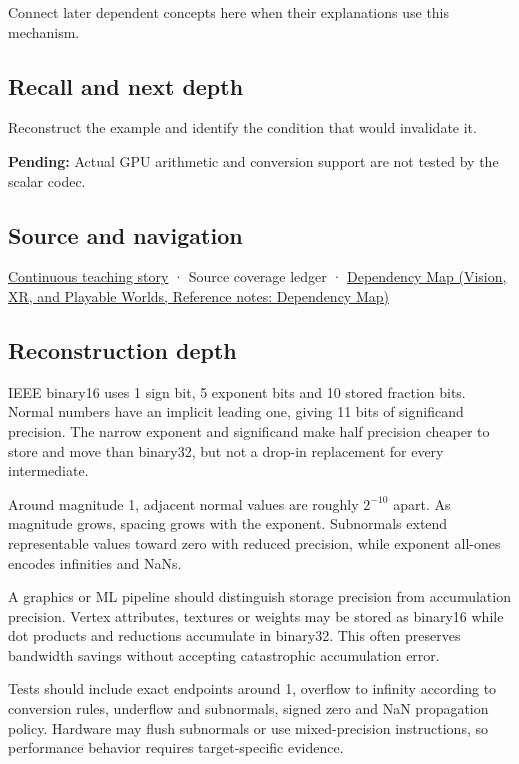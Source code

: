 Connect later dependent concepts here when their explanations use this mechanism.

\subsection{Recall and next depth}\label{appendix-34443cec7170-recall-and-next-depth}

\hypertarget{appendix-34443cec7170-recall-and-next-depth}{}

Reconstruct the example and identify the condition that would invalidate it.

\textbf{Pending:} Actual GPU arithmetic and conversion support are not tested by the scalar codec.

\subsection{Source and navigation}\label{appendix-34443cec7170-source-and-navigation}

\hypertarget{appendix-34443cec7170-source-and-navigation}{}

\hyperref[01-foundations-i-ch001-choosing-what-information-to-keep]{Continuous teaching story} · {Source coverage ledger} · \href{../07-Vision-XR-and-Playable-Worlds/main.pdf\#nameddest=appendix-4ad47bdd269a}{Dependency Map (Vision, XR, and Playable Worlds, Reference notes: Dependency Map)}

\subsection{Reconstruction depth}\label{appendix-34443cec7170-reconstruction-depth}

\hypertarget{appendix-34443cec7170-reconstruction-depth}{}

IEEE binary16 uses 1 sign bit, 5 exponent bits and 10 stored fraction bits. Normal numbers have an implicit leading one, giving 11 bits of significand precision. The narrow exponent and significand make half precision cheaper to store and move than binary32, but not a drop-in replacement for every intermediate.

Around magnitude 1, adjacent normal values are roughly \(2^{-10}\) apart. As magnitude grows, spacing grows with the exponent. Subnormals extend representable values toward zero with reduced precision, while exponent all-ones encodes infinities and NaNs.

A graphics or ML pipeline should distinguish storage precision from accumulation precision. Vertex attributes, textures or weights may be stored as binary16 while dot products and reductions accumulate in binary32. This often preserves bandwidth savings without accepting catastrophic accumulation error.

Tests should include exact endpoints around 1, overflow to infinity according to conversion rules, underflow and subnormals, signed zero and NaN propagation policy. Hardware may flush subnormals or use mixed-precision instructions, so performance behavior requires target-specific evidence.
